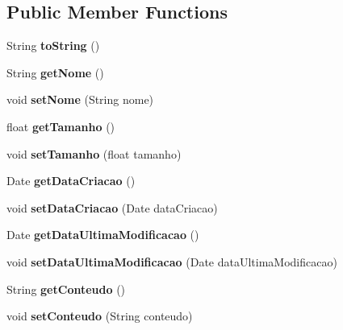 \subsection*{Public Member Functions}
\begin{DoxyCompactItemize}
\item 
\hypertarget{classmodel_1_1_arquivo_a580693728bbdaa7906333c7e5de74190}{String {\bfseries to\+String} ()}\label{classmodel_1_1_arquivo_a580693728bbdaa7906333c7e5de74190}

\item 
\hypertarget{classmodel_1_1_arquivo_a7d033e942466ae8f3150d3ee26a4f3dc}{String {\bfseries get\+Nome} ()}\label{classmodel_1_1_arquivo_a7d033e942466ae8f3150d3ee26a4f3dc}

\item 
\hypertarget{classmodel_1_1_arquivo_aeb26ae518929ffb319923f2627f6efc6}{void {\bfseries set\+Nome} (String nome)}\label{classmodel_1_1_arquivo_aeb26ae518929ffb319923f2627f6efc6}

\item 
\hypertarget{classmodel_1_1_arquivo_ae952e3c2814c80659c9544172e8c7148}{float {\bfseries get\+Tamanho} ()}\label{classmodel_1_1_arquivo_ae952e3c2814c80659c9544172e8c7148}

\item 
\hypertarget{classmodel_1_1_arquivo_a72de705e73dc067a3224ab424d3d7c43}{void {\bfseries set\+Tamanho} (float tamanho)}\label{classmodel_1_1_arquivo_a72de705e73dc067a3224ab424d3d7c43}

\item 
\hypertarget{classmodel_1_1_arquivo_afb695a8c5c9351d13ecf8992a47c62fc}{Date {\bfseries get\+Data\+Criacao} ()}\label{classmodel_1_1_arquivo_afb695a8c5c9351d13ecf8992a47c62fc}

\item 
\hypertarget{classmodel_1_1_arquivo_a92ea42514e4c2fe33738a880ede6374e}{void {\bfseries set\+Data\+Criacao} (Date data\+Criacao)}\label{classmodel_1_1_arquivo_a92ea42514e4c2fe33738a880ede6374e}

\item 
\hypertarget{classmodel_1_1_arquivo_ac26be3a6809e5318d6f3ac6569ecaf46}{Date {\bfseries get\+Data\+Ultima\+Modificacao} ()}\label{classmodel_1_1_arquivo_ac26be3a6809e5318d6f3ac6569ecaf46}

\item 
\hypertarget{classmodel_1_1_arquivo_a9a1fcff51bb12d03d9e8acc97272c9fc}{void {\bfseries set\+Data\+Ultima\+Modificacao} (Date data\+Ultima\+Modificacao)}\label{classmodel_1_1_arquivo_a9a1fcff51bb12d03d9e8acc97272c9fc}

\item 
\hypertarget{classmodel_1_1_arquivo_a651184830b8c5ed0985167d3b77fc7ae}{String {\bfseries get\+Conteudo} ()}\label{classmodel_1_1_arquivo_a651184830b8c5ed0985167d3b77fc7ae}

\item 
\hypertarget{classmodel_1_1_arquivo_ab374f2d11f50ef294c12676fa560e673}{void {\bfseries set\+Conteudo} (String conteudo)}\label{classmodel_1_1_arquivo_ab374f2d11f50ef294c12676fa560e673}

\end{DoxyCompactItemize}



